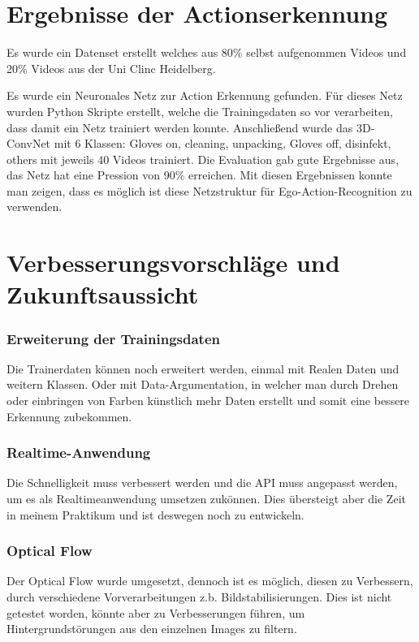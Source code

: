 \section{Ergebnisse der Actionserkennung}
\label{sec:ergebnisse}
Es wurde ein Datenset erstellt welches aus 80\% selbst aufgenommen Videos und 20\% Videos aus der Uni Clinc Heidelberg.


Es wurde ein Neuronales Netz zur Action Erkennung gefunden. Für dieses Netz wurden Python Skripte erstellt, welche die Trainingsdaten so vor verarbeiten, dass damit ein Netz trainiert werden konnte. Anschließend wurde das 3D-ConvNet mit 6 Klassen: Gloves on, cleaning, unpacking, Gloves off, disinfekt, others mit jeweils 40 Videos trainiert. Die Evaluation gab gute Ergebnisse aus, das Netz hat eine Pression von 90\% erreichen. Mit diesen Ergebnissen konnte man zeigen, dass es möglich ist diese Netzstruktur für Ego-Action-Recognition zu verwenden.


\section{Verbesserungsvorschläge und Zukunftsaussicht}
\label{sec:Verbesserungen}

\subsubsection{Erweiterung der Trainingsdaten}
Die Trainerdaten können noch erweitert werden, einmal mit Realen Daten und weitern Klassen.
Oder mit Data-Argumentation, in welcher man durch Drehen oder einbringen von Farben künstlich mehr Daten erstellt und somit eine bessere Erkennung zubekommen.

\subsubsection{Realtime-Anwendung}
Die Schnelligkeit muss verbessert werden und die API muss angepasst werden, um es als Realtimeanwendung umsetzen zukönnen.
Dies übersteigt aber die Zeit in meinem Praktikum und ist deswegen noch zu entwickeln.

\subsubsection{Optical Flow}
Der Optical Flow wurde umgesetzt, dennoch ist es möglich, diesen zu Verbessern, durch verschiedene Vorverarbeitungen z.b. Bildstabilisierungen. Dies ist nicht getestet worden, könnte aber zu Verbesserungen führen, um Hintergrundstörungen aus den einzelnen Images zu filtern.

